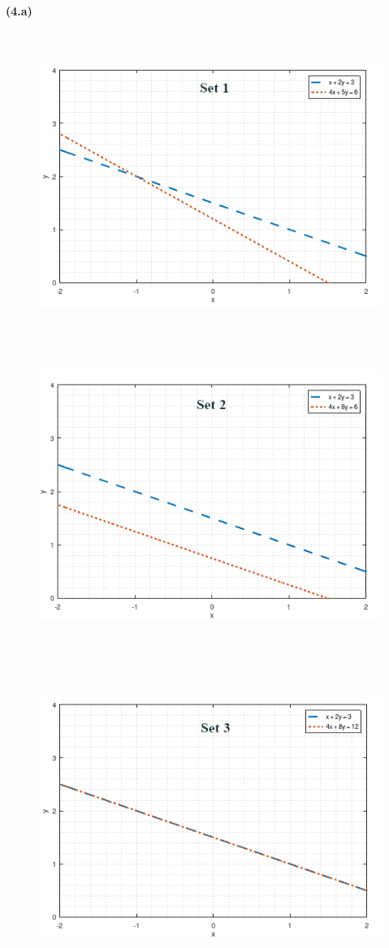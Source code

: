 \documentclass[12pt,letterpaper,fleqn]{article}
\theoremstyle{definition}
\begin{document}
\textbf{(4.a)}
	\begin{figure}[h!]
		\includegraphics[height=10cm]{4a1}
		\includegraphics[height=10cm]{4a2}
	\end{figure}
\newpage
	\begin{figure}[h!]
		\centering
		\includegraphics[height=10cm]{4a3}	
	\end{figure}
\end{document}
